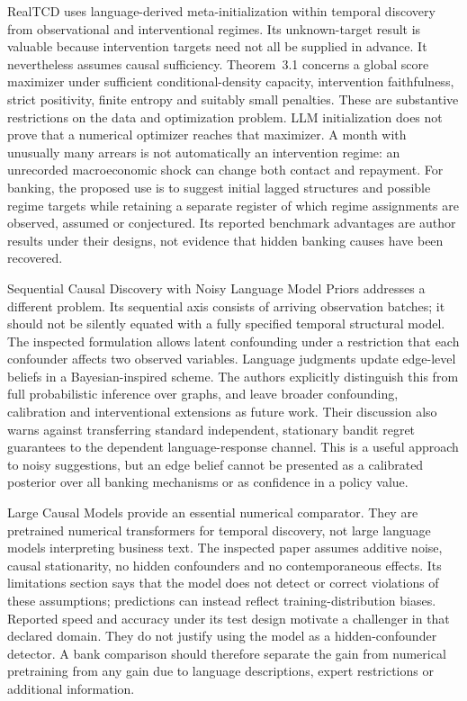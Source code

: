 RealTCD uses language-derived meta-initialization within temporal discovery
from observational and interventional regimes. Its unknown-target result is
valuable because intervention targets need not all be supplied in advance.
It nevertheless assumes causal sufficiency. Theorem~3.1 concerns a global
score maximizer under sufficient conditional-density capacity, intervention
faithfulness, strict positivity, finite entropy and suitably small penalties.
These are substantive restrictions on the data and optimization problem.
LLM initialization does not prove that a numerical optimizer reaches that
maximizer. A month with unusually many arrears is not automatically an
intervention regime: an unrecorded macroeconomic shock can change both
contact and repayment. For banking, the proposed use is to suggest initial
lagged structures and possible regime targets while retaining a separate
register of which regime assignments are observed, assumed or conjectured.
Its reported benchmark advantages are author results under their designs,
not evidence that hidden banking causes have been recovered.
\citep{v12_la_2404_14786}

Sequential Causal Discovery with Noisy Language Model Priors addresses a
different problem. Its sequential axis consists of arriving observation
batches; it should not be silently equated with a fully specified temporal
structural model. The inspected formulation allows latent confounding under
a restriction that each confounder affects two observed variables. Language
judgments update edge-level beliefs in a Bayesian-inspired scheme. The
authors explicitly distinguish this from full probabilistic inference over
graphs, and leave broader confounding, calibration and interventional
extensions as future work. Their discussion also warns against transferring
standard independent, stationary bandit regret guarantees to the dependent
language-response channel. This is a useful approach to noisy suggestions,
but an edge belief cannot be presented as a calibrated posterior over all
banking mechanisms or as confidence in a policy value.
\citep{v12_la_2506_16234}

Large Causal Models provide an essential numerical comparator. They are
pretrained numerical transformers for temporal discovery, not large language
models interpreting business text. The inspected paper assumes additive
noise, causal stationarity, no hidden confounders and no contemporaneous
effects. Its limitations section says that the model does not detect or
correct violations of these assumptions; predictions can instead reflect
training-distribution biases. Reported speed and accuracy under its test
design motivate a challenger in that declared domain. They do not justify
using the model as a hidden-confounder detector. A bank comparison should
therefore separate the gain from numerical pretraining from any gain due to
language descriptions, expert restrictions or additional information.
\citep{v12_la_2602_18662}


